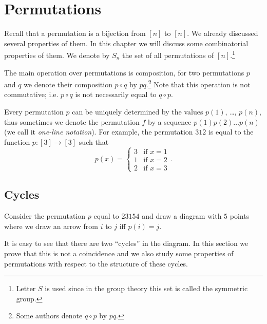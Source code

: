 \chapter{Permutations}
\label{chapter:permutations}
Recall that a permutation is a bijection from $[n]$ to $[n]$. We already
discussed several properties of them. In this chapter we will discuss some
combinatorial properties of them. We denote by $S_n$ the set of all
permutations of $[n]$.\footnote{%
  Letter $S$ is used since in the group theory this set is called
  the symmetric group.
}


The main operation over permutations is composition, for two permutations $p$
and $q$ we denote their composition $p \circ q$ by $pq$.\footnote{%
  Some authors denote $q \circ p$ by $pq$.
}
Note that this operation is not commutative; i.e. $p \circ q$ is not
necessarily equal to $q \circ p$.

Every permutation $p$ can be uniquely determined by the values $p(1)$, \dots,
$p(n)$, thus sometimes we denote the permutation $f$ by a sequence
$p(1) p(2) \dots p(n)$ (we call it \emph{one-line notation}).
For example, the permutation $3 1 2$ is equal to the function $p : [3] \to [3]$
such that
\[
  p(x) =
  \begin{cases}
    3 & \text{if } x = 1 \\
    1 & \text{if } x = 2 \\
    2 & \text{if } x = 3
  \end{cases}.
\]


\section{Cycles}
Consider the permutation $p$ equal to $2 3 1 5 4$ and draw a diagram with
$5$ points where we draw an arrow from $i$ to $j$ iff $p(i) = j$.
\begin{center}
\end{center}
It is easy to see that there are two ``cycles'' in the diagram. In this section
we prove that this is not a coincidence and we also study some properties of
permutations with respect to the structure of these cycles.

